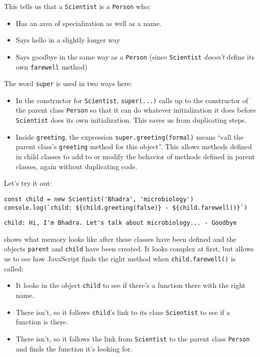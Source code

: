 This tells us that a \texttt{Scientist} is a \texttt{Person} who:

\begin{itemize}
\item
  Has an area of specialization as well as a name.
\item
  Says hello in a slightly longer way
\item
  Says goodbye in the same way as a \texttt{Person}
  (since \texttt{Scientist} \emph{doesn't} define its own \texttt{farewell} method)
\end{itemize}

The word \texttt{super} is used in two ways here:

\begin{itemize}
\item
  In the constructor for \texttt{Scientist},
  \texttt{super(...)} calls up to the constructor of the parent class \texttt{Person}
  so that it can do whatever initialization it does
  before \texttt{Scientist} does its own initialization.
  This saves us from duplicating steps.
\item
  Inside \texttt{greeting},
  the expression \texttt{super.greeting(formal)} means
  ``call the parent class's \texttt{greeting} method for this object''.
  This allows methods defined in child classes to add to or modify
  the behavior of methods defined in parent classes,
  again without duplicating code.
\end{itemize}

Let's try it out:

\begin{verbatim}
const child = new Scientist('Bhadra', 'microbiology')
console.log(`child: ${child.greeting(false)} - ${child.farewell()}`)
\end{verbatim}

\begin{verbatim}
child: Hi, I'm Bhadra. Let's talk about microbiology... - Goodbye
\end{verbatim}

 shows what memory looks like after these classes have been defined
and the objects \texttt{parent} and \texttt{child} have been created.
It looks complex at first,
but allows us to see how JavaScript finds the right method
when \texttt{child.farewell()} is called:

\begin{itemize}
\item
  It looks in the object \texttt{child} to see if there's a function there with the right name.
\item
  There isn't, so it follows \texttt{child}'s link to its class \texttt{Scientist}
  to see if a function is there.
\item
  There isn't, so it follows the link from \texttt{Scientist} to the parent class \texttt{Person}
  and finds the function it's looking for.
\end{itemize}

